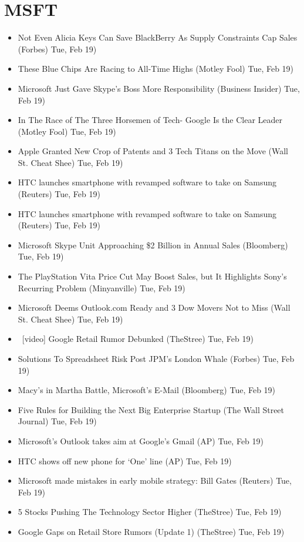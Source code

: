 \documentclass[11pt,asymmetric]{article}
\begin{document}
\section*{MSFT}
\begin{itemize}
\item Not Even Alicia Keys Can Save BlackBerry As Supply Constraints Cap Sales (Forbes) Tue, Feb 19)
\item These Blue Chips Are Racing to All-Time Highs (Motley Fool) Tue, Feb 19)
\item Microsoft Just Gave Skype's Boss More Responsibility (Business Insider) Tue, Feb 19)
\item In The Race of The Three Horsemen of Tech- Google Is the Clear Leader (Motley Fool) Tue, Feb 19)
\item Apple Granted New Crop of Patents and 3 Tech Titans on the Move (Wall St. Cheat Shee) Tue, Feb 19)
\item HTC launches smartphone with revamped software to take on Samsung (Reuters) Tue, Feb 19)
\item HTC launches smartphone with revamped software to take on Samsung (Reuters) Tue, Feb 19)
\item Microsoft Skype Unit Approaching \$2 Billion in Annual Sales (Bloomberg) Tue, Feb 19)
\item The PlayStation Vita Price Cut May Boost Sales, but It Highlights Sony's Recurring Problem (Minyanville) Tue, Feb 19)
\item Microsoft Deems Outlook.com Ready and 3 Dow Movers Not to Miss (Wall St. Cheat Shee) Tue, Feb 19)
\item\ [video] Google Retail Rumor Debunked (TheStree) Tue, Feb 19)
\item Solutions To Spreadsheet Risk Post JPM's London Whale (Forbes) Tue, Feb 19)
\item Macy's in Martha Battle, Microsoft's E-Mail (Bloomberg) Tue, Feb 19)
\item Five Rules for Building the Next Big Enterprise Startup (The Wall Street Journal) Tue, Feb 19)
\item Microsoft's Outlook takes aim at Google's Gmail (AP) Tue, Feb 19)
\item HTC shows off new phone for `One' line (AP) Tue, Feb 19)
\item Microsoft made mistakes in early mobile strategy: Bill Gates (Reuters) Tue, Feb 19)
\item 5 Stocks Pushing The Technology Sector Higher (TheStree) Tue, Feb 19)
\item Google Gaps on Retail Store Rumors (Update 1) (TheStree) Tue, Feb 19)

\end{itemize}
\end{document}
